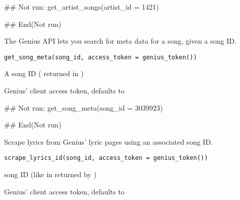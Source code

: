 \documentclass[a4paper]{book}
\begin{document}
%
\begin{Examples}
\begin{ExampleCode}
## Not run: 
get_artist_songs(artist_id = 1421)

## End(Not run)
\end{ExampleCode}
\end{Examples}
%
\begin{Description}\relax
The Genius API lets you search for meta data for a song, given a song ID.
\end{Description}
%
\begin{Usage}
\begin{verbatim}
get_song_meta(song_id, access_token = genius_token())
\end{verbatim}
\end{Usage}
%
\begin{Arguments}
\begin{ldescription}
\item[\code{song\_id}] A song ID ( returned in )

\item[\code{access\_token}] Genius' client access token, defaults to 
\end{ldescription}
\end{Arguments}
%
\begin{Examples}
\begin{ExampleCode}
## Not run: 
get_song_meta(song_id = 3039923)

## End(Not run)
\end{ExampleCode}
\end{Examples}
%
\begin{Description}\relax
Scrape lyrics from Genius' lyric pages using an associated song ID.
\end{Description}
%
\begin{Usage}
\begin{verbatim}
scrape_lyrics_id(song_id, access_token = genius_token())
\end{verbatim}
\end{Usage}
%
\begin{Arguments}
\begin{ldescription}
\item[\code{song\_id}] song ID (like in  returned by )

\item[\code{access\_token}] Genius' client access token, defaults to 
\end{ldescription}
\end{Arguments}
\end{document}
